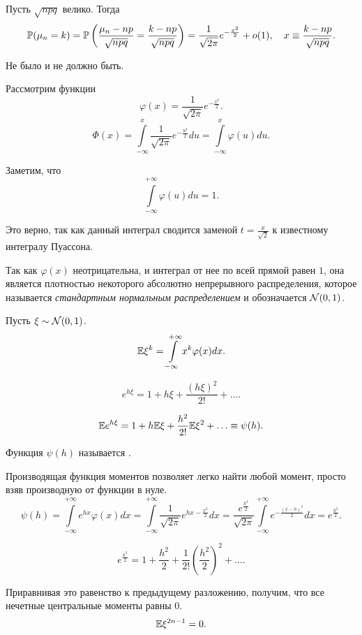 \documentclass[../TV&MS.tex]{subfiles}
\begin{document}
\begin{Th}
	Пусть $\sqrt{npq}$ велико. Тогда
	$$\mathbb{P}(\mu_n = k) = \mathbb{P}\left(\frac{\mu_n - np}{\sqrt{npq}} = \frac{k - np}{\sqrt{npq}}\right) = 
	\frac{1}{\sqrt{2\pi}}e^{-\frac{x^2}2} + o(1), \quad x \equiv \frac{k - np}{\sqrt{npq}}.$$
\end{Th}

\begin{Proof} 
	Не было и не должно быть.
\end{Proof}

	Рассмотрим функции
	$$\varphi(x) = \frac{1}{\sqrt{2\pi}}e^{-\frac{x^2}2}.$$
	$$\Phi(x) = \int\limits_{-\infty}^x \frac{1}{\sqrt{2\pi}}e^{-\frac{u^2}2} du 
	= \int\limits_{-\infty}^{x}\varphi(u)du.$$

	Заметим, что 
	$$\int\limits_{-\infty}^{+\infty} \varphi(u)du = 1.$$ 

	Это верно, так как данный интеграл сводится заменой $t = \frac{x}{\sqrt{2}}$ 
	к известному интегралу Пуассона.

	Так как $\varphi(x)$ неотрицательна, и интеграл от нее по всей прямой равен $1$, 
	она является плотностью некоторого абсолютно непрерывного распределения, которое называется 
	\emph{стандартным нормальным распределением} и обозначается $\mathcal{N}(0, 1)$.

	Пусть $\xi \sim \mathcal{N}(0,1)$.
	$$\mathbb{E}\xi^k = \int\limits_{-\infty}^{+\infty}x^k\varphi(x)dx.$$

	$$e^{h\xi}=1 + h\xi + \frac{(h\xi)^2}{2!} + \ldots.$$

	$$\mathbb{E} e^{h\xi} = 1 + h\mathbb{E}\xi + \frac{h^2}{2!}\mathbb{E}\xi^2 + \ldots \equiv \psi(h).$$

\begin{Def}
    Функция $\psi(h)$ называется .
\end{Def}

	Производящая функция моментов позволяет легко найти любой момент, 
	просто взяв производную от функции в нуле.
	$$\psi(h) = \int\limits_{-\infty}^{+\infty}e^{hx}\varphi(x)dx = \int\limits_{-\infty}^{+\infty}
	\frac{1}{\sqrt{2\pi}}e^{hx-\frac{x^2}2}dx = \frac{e^{\frac{h^2}2}}{\sqrt{2\pi}}
	\int\limits_{-\infty}^{+\infty}e^{-\frac{(x-h)^2}2}dx = e^{\frac{h^2}2}.$$
	
	$$e^{\frac{h^2}2} = 1 + \frac{h^2}2 + \frac1{2!}\left(\frac{h^2}2\right)^2 + \ldots.$$
	
	Приравнивая это равенство к предыдущему разложению, получим, 
	что все нечетные центральные моменты равны $0$.
	$$\mathbb{E}\xi^{2n-1} = 0.$$
	
\end{document}
